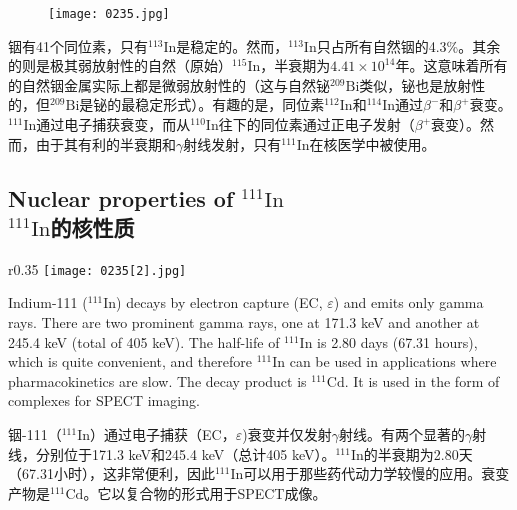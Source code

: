 \documentclass[dvipsnames, svgnames,a4paper,11pt]{article}
\begin{document}
\begin{figure}[h]
	\centering
    \texttt{[image: 0235.jpg]}  
     \label{fig312}
\end{figure}

铟有41个同位素，只有\(\mathrm{^{113}In}\)是稳定的。然而，\(\mathrm{^{113}In}\)只占所有自然铟的4.3\%。其余的则是极其弱放射性的自然（原始）\(\mathrm{^{115}In}\)，半衰期为\(4.41 \times 10^{14}\)年。这意味着所有的自然铟金属实际上都是微弱放射性的（这与自然铋\(\mathrm{^{209}Bi}\)类似，铋也是放射性的，但\(\mathrm{^{209}Bi}\)是铋的最稳定形式）。有趣的是，同位素\(\mathrm{^{112}In}\)和\(\mathrm{^{114}In}\)通过\(\beta^-\)和\(\beta^+\)衰变。 \(\mathrm{^{111}In}\)通过电子捕获衰变，而从\(\mathrm{^{110}In}\)往下的同位素通过正电子发射（\(\beta^+\)衰变）。然而，由于其有利的半衰期和$\gamma$射线发射，只有\(\mathrm{^{111}In}\)在核医学中被使用。



\subsection{Nuclear properties of \(\mathrm{^{111}In}\)\\ \(\mathrm{^{111}In}\)的核性质}  

\begin{wrapfigure}{r}{0.35\textwidth}
    \centering
    \texttt{[image: 0235[2].jpg]}
     \label{fig313}
\end{wrapfigure}

Indium-111 (\(\mathrm{^{111}In}\)) decays by electron capture (EC, \(\varepsilon\)) and emits only gamma rays. There are two prominent gamma rays, one at 171.3 keV and another at 245.4 keV (total of 405 keV). The half-life of \(\mathrm{^{111}In}\) is 2.80 days (67.31 hours), which is quite convenient, and therefore \(\mathrm{^{111}In}\) can be used in applications where pharmacokinetics are slow. The decay product is \(\mathrm{^{111}Cd}\). It is used in the form of complexes for SPECT imaging.

铟-111（\(\mathrm{^{111}In}\)）通过电子捕获（EC，\(\varepsilon\))衰变并仅发射$\gamma$射线。有两个显著的$\gamma$射线，分别位于171.3 keV和245.4 keV（总计405 keV）。\(\mathrm{^{111}In}\)的半衰期为2.80天（67.31小时），这非常便利，因此\(\mathrm{^{111}In}\)可以用于那些药代动力学较慢的应用。衰变产物是\(\mathrm{^{111}Cd}\)。它以复合物的形式用于SPECT成像。
\end{document}
